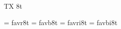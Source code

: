 
\ifx\ffdecl\undefined  \fi

\ffdecl [ArevSans] {\rm \bf \it \bi} {} {} {TX} {8t}

\ismacro{}\ifttrue

   \font\tenrm = favr8t  \sizespec
   \font\tenbf = favb8t  \sizespec
   \font\tenit = favri8t \sizespec
   \font\tenbi = favbi8t \sizespec

   \let\ffnamegen=\undefined %

\fi
\tenrm %

\ifx\loadmathfonts\relax \endinput \fi
\ifx\mathpreloaded X\else  \fi                     

\endinput
